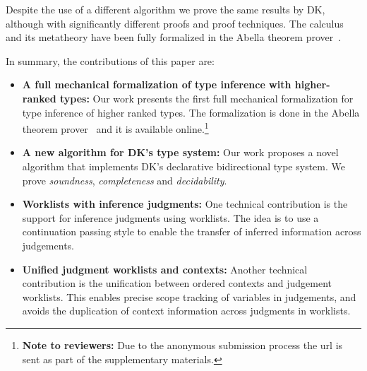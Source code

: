 Despite the use of a different algorithm we prove the
same results by DK, although with significantly different proofs and
proof techniques. The calculus and its metatheory
have been fully formalized in the Abella theorem prover~\cite{AbellaDesc}. %

In summary, the contributions of this paper are:

\begin{itemize}

\item {\bf A full mechanical formalization of type inference with
  higher-ranked types:} Our work presents the first full mechanical formalization
  for type inference of higher ranked types. The formalization is done in the
  Abella theorem prover~\cite{AbellaDesc} and it is available
  online.\footnote{{\bf Note to reviewers:} Due to the anonymous submission process
  the url is sent as part of the supplementary materials.}

\item {\bf A new algorithm for DK's type system:} Our work proposes a novel algorithm that implements
  DK's declarative bidirectional type system. We prove
  \emph{soundness}, \emph{completeness} and
  \emph{decidability}. 

\item {\bf Worklists with inference judgments:} One technical contribution is the
  support for inference judgments using worklists. The idea is to
  use a continuation passing style to enable the transfer of inferred information across
  judgements. 

\item {\bf Unified judgment worklists and contexts:} Another technical contribution is the unification
  between ordered contexts and judgement worklists. This enables precise scope tracking
  of variables in judgements, and avoids the duplication of context information across
  judgments in worklists.

\end{itemize}
